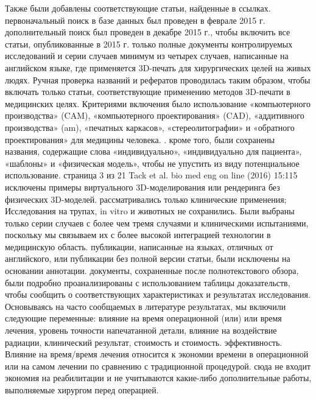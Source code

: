 Также были добавлены соответствующие статьи, найденные в ссылках. первоначальный
поиск в базе данных был проведен в феврале 2015 г. дополнительный поиск был
проведен в декабре 2015 г., чтобы включить все статьи, опубликованные в 2015 г.
только полные документы контролируемых исследований и серии случаев минимум из
четырех случаев, написанные на английском языке, где применяется 3D-печать для
хирургических целей на живых людях. Ручная проверка названий и рефератов
проводилась таким образом, чтобы включать только статьи, соответствующие
применению методов 3D-печати в медицинских целях. Критериями включения было
использование «компьютерного производства» (CAM), «компьютерного проектирования»
(CAD), «аддитивного производства» (am), «печатных каркасов», «стереолитографии»
и «обратного проектирования» для медицины человека. . кроме того, были сохранены
названия, содержащие слова «индивидуально», «индивидуально для пациента»,
«шаблоны» и «физическая модель», чтобы не упустить из виду потенциальное
использование. страница 3 из 21 Tack et al. bio med eng on line (2016) 15:115
исключены примеры виртуального 3D-моделирования или рендеринга без физических
3D-моделей. рассматривались только клинические применения; Исследования на
трупах, in vitro и животных не сохранились. Были выбраны только серии случаев с
более чем тремя случаями и клиническими испытаниями, поскольку мы связываем их с
более высокой интеграцией технологии в медицинскую область. публикации,
написанные на языках, отличных от английского, или публикации без полной версии
статьи, были исключены на основании аннотации. документы, сохраненные после
полнотекстового обзора, были подробно проанализированы с использованием таблицы
доказательств, чтобы сообщить о соответствующих характеристиках и результатах
исследования. Основываясь на часто сообщаемых в литературе результатах, мы
включили следующие переменные: влияние на время операционной (или) или время
лечения, уровень точности напечатанной детали, влияние на воздействие радиации,
клинический результат, стоимость и стоимость. эффективность. Влияние на
время/время лечения относится к экономии времени в операционной или на самом
лечении по сравнению с традиционной процедурой. сюда не входит экономия на
реабилитации и не учитываются какие-либо дополнительные работы, выполняемые
хирургом перед операцией.

